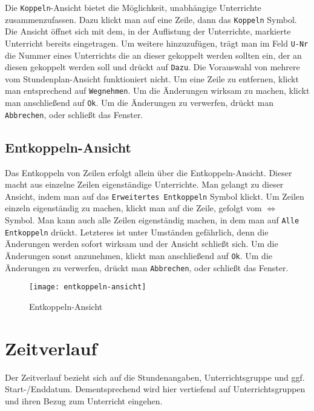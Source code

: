 Die \texttt{Koppeln}-Ansicht bietet die Möglichkeit, unabhängige Unterrichte zusammenzufassen. Dazu klickt man auf eine Zeile, dann das \texttt{Koppeln} Symbol. Die Ansicht öffnet sich mit dem, in der Auflistung der Unterrichte, markierte Unterricht bereits eingetragen. Um weitere hinzuzufügen, trägt man im Feld \texttt{U-Nr} die Nummer eines Unterrichts die an dieser gekoppelt werden sollten ein, der an diesen gekoppelt werden soll und drückt auf \texttt{Dazu}. Die Vorauswahl von mehrere vom Stundenplan-Ansicht funktioniert nicht. Um eine Zeile zu entfernen, klickt man entsprechend auf \texttt{Wegnehmen}. Um die Änderungen wirksam zu machen, klickt man anschließend auf \texttt{Ok}. Um die Änderungen zu verwerfen, drückt man \texttt{Abbrechen}, oder schließt das Fenster.

\newpage

\subsection{Entkoppeln-Ansicht}

Das Entkoppeln von Zeilen erfolgt allein über die Entkoppeln-Ansicht. Dieser macht aus einzelne Zeilen eigenständige Unterrichte. Man gelangt zu dieser Ansicht, indem man auf das \texttt{Erweitertes Entkoppeln} Symbol klickt. Um Zeilen einzeln eigenständig zu machen, klickt man auf die Zeile, gefolgt vom $\Leftrightarrow$ Symbol. Man kann auch alle Zeilen eigenständig machen, in dem man auf \texttt{Alle Entkoppeln} drückt. Letzteres ist unter Umständen gefährlich, denn die Änderungen werden sofort wirksam und der Ansicht schließt sich. Um die Änderungen sonst anzunehmen, klickt man anschließend auf \texttt{Ok}. Um die Änderungen zu verwerfen, drückt man \texttt{Abbrechen}, oder schließt das Fenster.

\begin{figure}[h]
	\centering
	\texttt{[image: entkoppeln-ansicht]}
	\vspace{-5pt}
	\caption{Entkoppeln-Ansicht}
	\label{fig:entkoppeln-ansicht}
\end{figure}


\section{Zeitverlauf}
\label{sec:zeitverlauf}

Der Zeitverlauf bezieht sich auf die Stundenangaben, Unterrichtsgruppe und ggf. Start-/Enddatum. Dementsprechend wird hier vertiefend auf Unterrichtsgruppen und ihren Bezug zum Unterricht eingehen.

